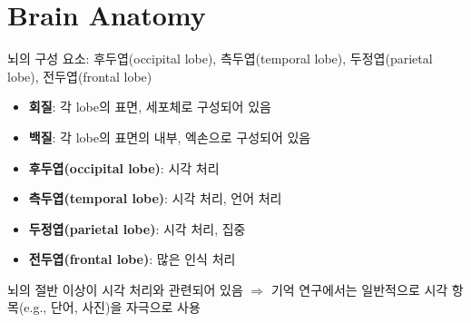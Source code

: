 \documentclass[../note.tex]{subfiles}
\begin{document}
\section{Brain Anatomy}
뇌의 구성 요소: 후두엽(occipital lobe), 측두엽(temporal lobe), 두정엽(parietal lobe), 전두엽(frontal lobe)

{
  \vspace{-2em}
  \begin{itemize}
    \item \textbf{회질}: 각 lobe의 표면, 세포체로 구성되어 있음
    \item \textbf{백질}: 각 lobe의 표면의 내부, 엑손으로 구성되어 있음
  \end{itemize}
}

{
  \vspace{-2em}
  \begin{itemize}
    \item \textbf{후두엽(occipital lobe)}: 시각 처리
    \item \textbf{측두엽(temporal lobe)}: 시각 처리, 언어 처리
    \item \textbf{두정엽(parietal lobe)}: 시각 처리, 집중
    \item \textbf{전두엽(frontal lobe)}: 많은 인식 처리
  \end{itemize}
  뇌의 절반 이상이 시각 처리와 관련되어 있음 $\Rightarrow$ 기억 연구에서는 일반적으로 시각 항목(e.g., 단어, 사진)을 자극으로 사용
}
\end{document}

